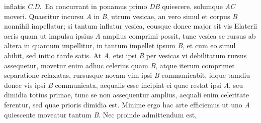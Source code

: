 %
inflatis \textit{C}.\textit{D}.\ Ea concurrant
in  
ponamus primo \textit{DB} quiescere, solumque \textit{AC} moveri.\pend
%
\pstart
Quaeritur incursu \textit{A} in \textit{B}, utrum 
 {}
vesicae,%
\protect{} an vero simul et corpus
\textit{B} nonnihil impellatur; si tantum inflatur vesica,%
\protect{} eousque donec major sit vis Elaterii%
\protect{} aeris%
\protect{}%
\protect{} quam ut
impulsu ipsius \textit{A} amplius comprimi possit, tunc vesica%
\protect{} se rursus ab altera 
  {}
in quantum impellitur, in tantum impellet ipsum \textit{B}, et cum eo simul abibit, sed initio tarde satis.
At \textit{A}, etsi  
ipsi \textit{B} per vesicas%
\protect{} vi%
\protect{} debilitatum
rursus assequetur, movetur
enim adhuc celerius quam \textit{B}, atque iterum comprimet  
  {}
separatione relaxatas, 
rursusque
novam vim%
\protect{} ipsi \textit{B} communicabit, 
idque tamdiu donec vis ipsi \textit{B} communicata, 
aequalis esse
incipiat ei quae restat ipsi \textit{A}, seu dimidia totius primae, tunc se non assequentur amplius, aequali enim 
celeritate%
\protect{} ferentur, sed quae prioris dimidia est. Minime ergo hac arte efficiemus ut %
%
%
%
uno \textit{A} quiescente moveatur tantum \textit{B}.
\pend
%
\pstart
Nec%
%
proinde admittendum est,
  {}
